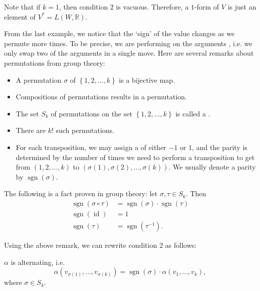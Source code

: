 \documentclass[notoc,notitlepage]{tufte-book}
\DeclareMathOperator{\sgn}{sgn}
\DeclareMathOperator{\id}{id}
\begin{document}
\begin{note}
  Note that if $k = 1$, then condition 2 is vacuous. Therefore, a $1$-form of
  $V$ is just an element of $V^* = L(W, \mathbb{R})$.
\end{note}

\begin{remark}[Permutations]\label{remark:permutations}
  From the last example, we notice that the `sign' of the value changes
  as we permute more times. To be precise, we are performing 
  on the arguments
  ,
  i.e. we only swap two of the arguments in a single move.
  Here are several remarks about permutations from group theory:
  \begin{itemize}
    \item A permutation $\sigma$ of $\left\{ 1, 2, \ldots, k \right\}$ is a
      bijective map.
    \item Compositions of permutations results in a permutation.
    \item The set $S_k$ of permutations on the set $\left\{ 1, 2, \ldots, k \right\}$
      is called a .
    \item There are $k!$ such permutations.
    \item For each transposition, we may assign a  of either $-1$ or $1$,
      and the parity is determined by the number of times we need to perform a transposition
      to get from $(1, 2, \ldots, k)$ to $(\sigma(1), \sigma(2), \ldots, \sigma(k))$. We
      usually denote a parity by $\sgn(\sigma)$.
  \end{itemize}

  The following is a fact proven in group theory: let $\sigma, \tau \in S_k$. Then
  \begin{align*}
    \sgn(\sigma \circ \tau) &= \sgn(\sigma) \cdot \sgn(\tau) \\
    \sgn(\id) &= 1 \\
    \sgn(\tau) &= \sgn(\tau^{-1}).
  \end{align*}
\end{remark}

Using the above remark, we can rewrite condition 2 as follows:

\begin{note}
  $\alpha$ is alternating, i.e.
  \begin{equation*}
    \alpha(v_{\sigma(1)}, \ldots, v_{\sigma(k)}) = \sgn(\sigma) \cdot \alpha(v_1, \ldots, v_k),
  \end{equation*}
  where $\sigma \in S_k$.
\end{note}
\end{document}
